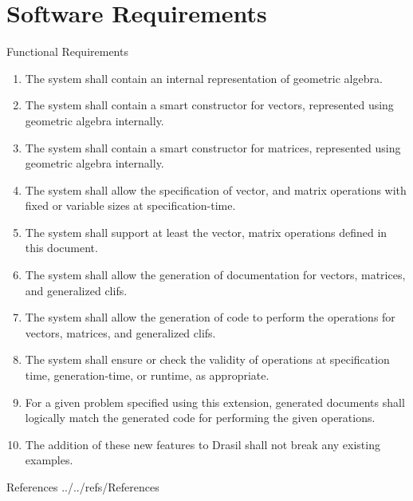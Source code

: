 \documentclass[aspectratio=169,xcolor=dvipsnames]{beamer}
\begin{document}
\section{Software Requirements}

\begin{frame}{Functional Requirements}
      \begin{enumerate}
\item<only@1> The system shall contain an internal representation of geometric algebra.
\item<only@1> The system shall contain a smart constructor for vectors, represented using
      geometric algebra internally.
\item<only@1> The system shall contain a smart constructor for matrices, represented using
      geometric algebra internally.
\item<only@1> The system shall allow the specification of vector, and
      matrix operations with fixed or variable sizes at specification-time.
\item<only@1> The system shall support at least the vector, matrix operations
      defined in this document.
\item<only@1> The system shall allow the generation of documentation for vectors, matrices,
      and generalized clifs.
\item<only@1> The system shall allow the generation of code to perform the operations
      for vectors, matrices, and generalized clifs.
\item<only@1> The system shall ensure or check the validity of operations at specification 
      time, generation-time, or runtime, as appropriate.
\item<only@2> For a given problem specified using this extension, generated documents shall 
      logically match the generated code for performing the given operations.
\item<only@2> The addition of these new features to Drasil shall not break any existing
      examples.
      \end{enumerate}
\end{frame}


\begin{frame}{References}
    \tiny
     {../../refs/References}
    
\end{frame}

\end{document}
